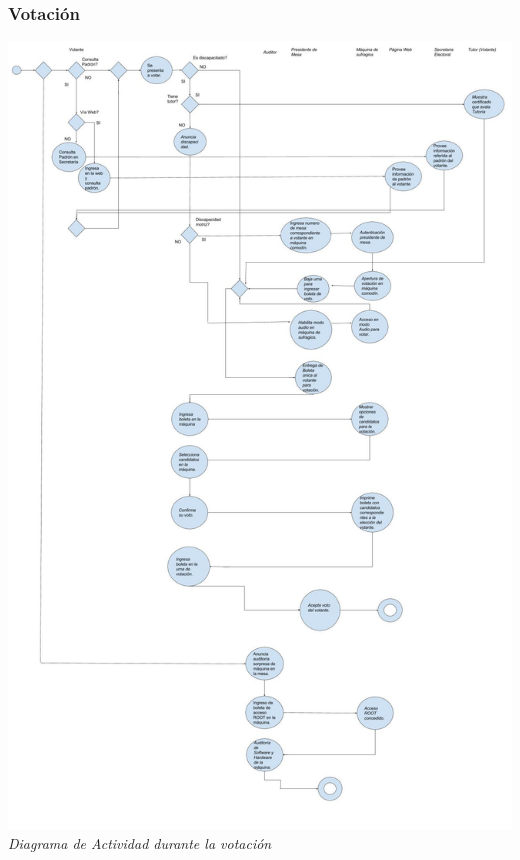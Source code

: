 \documentclass[spanish, 10pt,a4paper]{article}
\numberwithin{equation}{section} %
\begin{document}
\subsubsection{Votación}
\vspace{\baselineskip}
    \begin{center}
                \includegraphics[scale=0.32]{imagenes/actividad/Llegadadevotante-auditor.jpg}
                \\
                \vspace{1pt}
                \footnotesize\textit{Diagrama de Actividad durante la votación}
        \end{center}
\vspace{\baselineskip}
\end{document}
